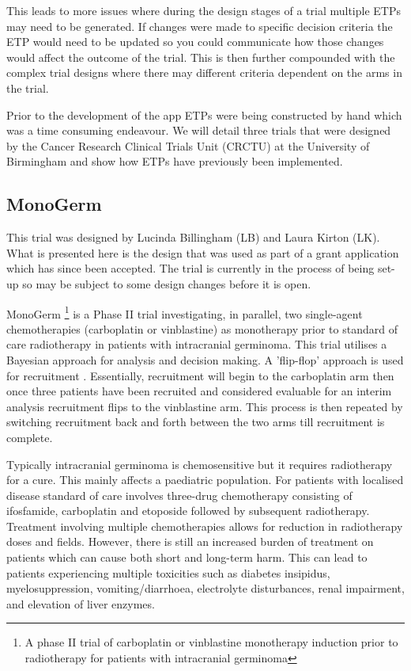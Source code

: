 This leads to more issues where during the design stages of a trial multiple ETPs may need to be generated. If changes were made to specific decision criteria the ETP would need to be updated so you could communicate how those changes would affect the outcome of the trial. This is then further compounded with the complex trial designs where there may different criteria dependent on the arms in the trial.

Prior to the development of the app ETPs were being constructed by hand which was a time consuming endeavour. We will detail three trials that were designed by the Cancer Research Clinical Trials Unit (CRCTU) at the University of Birmingham and show how ETPs have previously been implemented. 


\subsection{MonoGerm} 

This trial was designed by Lucinda Billingham (LB) and Laura Kirton (LK). What is presented here is the design that was used as part of a grant application which has since been accepted. The trial is currently in the process of being set-up so may be subject to some design changes before it is open. 

MonoGerm \footnote{A phase II trial of carboplatin or vinblastine monotherapy induction prior to radiotherapy for patients with intracranial germinoma} is a Phase \RN{2} trial investigating, in parallel, two single-agent chemotherapies (carboplatin or vinblastine) as monotherapy prior to standard of care radiotherapy in patients with intracranial germinoma. This trial utilises a Bayesian approach for analysis and decision making. A 'flip-flop' approach is used for recruitment \cite{harringtonGuidelinesPreclinicalEarly2011}. Essentially, recruitment will begin to the carboplatin arm then once three patients have been recruited and considered evaluable for an interim analysis recruitment flips to the vinblastine arm. This process is then repeated by switching recruitment back and forth between the two arms till recruitment is complete. 

Typically intracranial germinoma is chemosensitive but it requires radiotherapy for a cure. This mainly affects a paediatric population. For patients with localised disease standard of care involves three-drug chemotherapy consisting of ifosfamide, carboplatin and etoposide followed by subsequent radiotherapy. Treatment involving multiple chemotherapies allows for reduction in radiotherapy doses and fields. However, there is still an increased burden of treatment on patients which can cause both short and long-term harm. This can lead to patients experiencing multiple toxicities such as diabetes insipidus, myelosuppression, vomiting/diarrhoea, electrolyte disturbances, renal impairment, and elevation of liver enzymes. 

